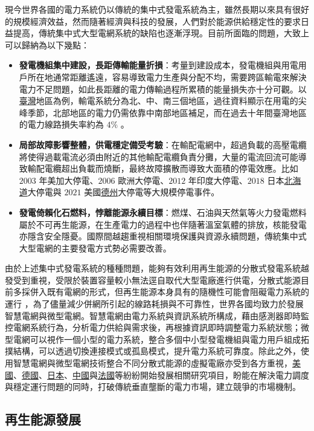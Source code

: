 現今世界各國的電力系統仍以傳統的集中式發電系統為主，雖然長期以來具有很好的規模經濟效益，然而隨著經濟與科技的發展，人們對於能源供給穩定性的要求日益提高，傳統集中式大型電網系統的缺陷也逐漸浮現。目前所面臨的問題，大致上可以歸納為以下幾點：

\begin{itemize}
  \item \textbf{發電機組集中建設，長距傳輸能量折損}：考量到建設成本，發電機組與用電用戶所在地通常距離遙遠，容易導致電力生產與分配不均，需要跨區輸電來解決電力不足問題，如此長距離的電力傳輸過程所累積的能量損失亦十分可觀。以\uline{臺灣}地區為例，輸電系統分為北、中、南三個地區，過往資料顯示在用電的尖峰季節，北部地區的電力仍需依靠中南部地區補足，而在過去十年間臺灣地區的電力線路損失率約為 $4\%$ \cite{boe2021data}。
  \item \textbf{局部故障影響整體，供電穩定備受考驗}：在輸配電網中，超過負載的高壓電纜將使得過載電流必須由附近的其他輸配電纜負責分攤，大量的電流回流可能導致輸配電纜超出負載而燒斷，最終故障擴散而導致大面積的停電效應。比如 $2003$ 年美加大停電、$2006$ 歐洲大停電、$2012$ 年印度大停電、$2018$ 日本\uline{北海道}大停電與 $2021$ 美國\uline{德州}大停電等大規模停電事件。
  \item \textbf{發電倚賴化石燃料，悖離能源永續目標}：燃煤、石油與天然氣等火力發電燃料屬於不可再生能源，在生產電力的過程中也伴隨著溫室氣體的排放，核能發電亦隱含安全隱憂。國際間越趨重視相關環境保護與資源永續問題，傳統集中式大型電網的主要發電方式勢必需要改善。
\end{itemize}

由於上述集中式發電系統的種種問題，能夠有效利用再生能源的分散式發電系統越發受到重視，受限於裝置容量較小無法逕自取代大型電廠進行供電，分散式能源目前多採併入既有電網的形式，但再生能源本身具有的隨機性可能會阻礙電力系統的運行 \cite{guan2009research}，為了儘量減少併網所引起的線路耗損與不可靠性，世界各國均致力於發展智慧電網與微型電網。智慧電網由電力系統與資訊系統所構成，藉由感測器即時監控電網系統行為，分析電力供給與需求後，再根據資訊即時調整電力系統狀態；微型電網可以視作一個小型的電力系統，整合多個中小型發電機組與電力用戶組成拓撲結構，可以透過切換連接模式或孤島模式，提升電力系統可靠度。除此之外，使用智慧電網與微型電網技術整合不同分散式能源的虛擬電廠亦受到各方重視，\uline{美國}、\uline{德國}、\uline{日本}、\uline{中國}與\uline{法國}等紛紛開始發展相關研究項目，盼能在解決電力調度與穩定運行問題的同時，打破傳統垂直壟斷的電力市場，建立競爭的市場機制。

\subsection{再生能源發展}

